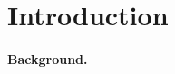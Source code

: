\documentclass[a4paper,11pt]{article}
\begin{document}
\newpage
\listoftables
{}

\newpage
\setcounter{page}{1}    %

\nocite{@wang2016}

\hypertarget{introduction}{%
\section{Introduction}\label{introduction}}

\hypertarget{background.}{%
\paragraph{Background.}\label{background.}}
\end{document}
